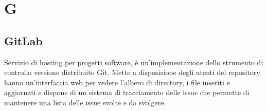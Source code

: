\section*{G}

\subsection{GitLab}
Servizio di hosting per progetti software, è un'implementazione dello strumento di controllo versione distribuito Git. Mette a disposizione degli utenti del repository hanno un'interfaccia web per vedere l'albero di directory, i file inseriti e aggiornati e dispone di un sistema di tracciamento delle issue che permette di mantenere una lista delle issue svolte e da svolgere.
